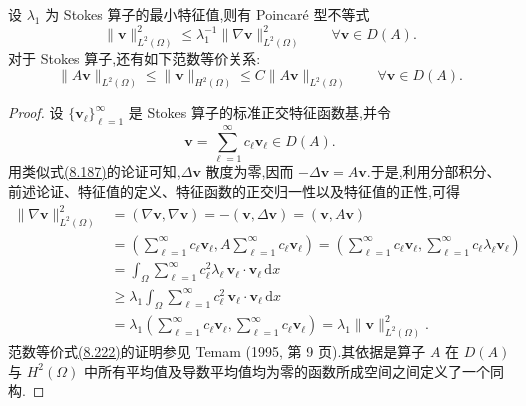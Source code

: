 \begin{lemma}[范数估计]
\label{lem:navier-stokes-alpha-norm-estimates}
设 $\lambda_1$ 为 Stokes 算子的最小特征值,则有 Poincaré 型不等式
\begin{equation}\label{eq:navier-stokes-alpha-poincare}
 \|\bm{v}\|_{L^2(\Omega)}^2
 \le \lambda_1^{-1}\|\nabla\bm{v}\|_{L^2(\Omega)}^2
 \qquad\forall\bm{v}\in D(A).
\end{equation}
对于 Stokes 算子,还有如下范数等价关系:
\begin{equation}\label{eq:navier-stokes-alpha-stokes-norm-equivalence}
 \|A\bm{v}\|_{L^2(\Omega)}
 \le \|\bm{v}\|_{H^2(\Omega)}
 \le C\|A\bm{v}\|_{L^2(\Omega)}
 \qquad\forall\bm{v}\in D(A).
\end{equation}
\begin{proof}
设 $\{\bm{v}_\ell\}_{\ell=1}^\infty$ 是 Stokes 算子的标准正交特征函数基,并令
\[
 \bm{v}=\sum_{\ell=1}^\infty c_\ell\bm{v}_\ell\in D(A).
\]
用类似式\hyperref[eq:les-adm-divergence-filter-commutation]{(8.187)}的论证可知,$\Delta\bm{v}$ 散度为零,因而 $-\Delta\bm{v}=A\bm{v}$.于是,利用分部积分、前述论证、特征值的定义、特征函数的正交归一性以及特征值的正性,可得
\[
\begin{aligned}
 \|\nabla\bm{v}\|_{L^2(\Omega)}^2
 &= (\nabla\bm{v},\nabla\bm{v})
  =-(\bm{v},\Delta\bm{v})=(\bm{v},A\bm{v})\\
 &=\left(\sum_{\ell=1}^\infty c_\ell\bm{v}_\ell,
          A\sum_{\ell=1}^\infty c_\ell\bm{v}_\ell\right)
  =\left(\sum_{\ell=1}^\infty c_\ell\bm{v}_\ell,
          \sum_{\ell=1}^\infty c_\ell\lambda_\ell\bm{v}_\ell\right)\\
 &=\int_\Omega\sum_{\ell=1}^\infty
      c_\ell^2\lambda_\ell\,\bm{v}_\ell\cdot\bm{v}_\ell\,\mathrm{d}x\\
 &\ge\lambda_1\int_\Omega\sum_{\ell=1}^\infty
      c_\ell^2\,\bm{v}_\ell\cdot\bm{v}_\ell\,\mathrm{d}x\\
 &=\lambda_1\left(\sum_{\ell=1}^\infty c_\ell\bm{v}_\ell,
                   \sum_{\ell=1}^\infty c_\ell\bm{v}_\ell\right)
  =\lambda_1\|\bm{v}\|_{L^2(\Omega)}^2.
\end{aligned}
\]
范数等价式\hyperref[eq:navier-stokes-alpha-stokes-norm-equivalence]{(8.222)}的证明参见 Temam (1995, 第 9 页).其依据是算子 $A$ 在 $D(A)$ 与 $H^2(\Omega)$ 中所有平均值及导数平均值均为零的函数所成空间之间定义了一个同构.
\end{proof}
\end{lemma}

